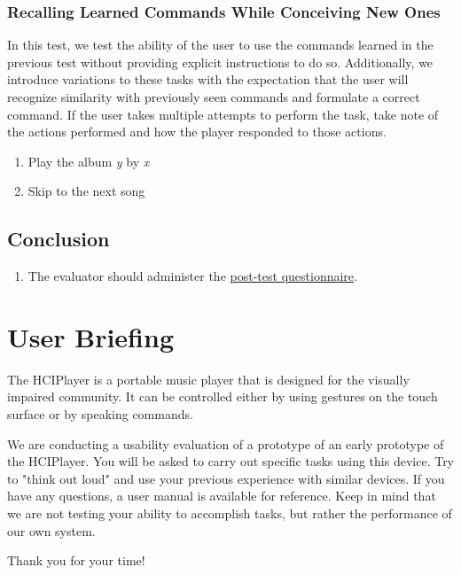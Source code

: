 \documentclass[12pt,letterpaper]{article}
\begin{document}
\subsubsection{Recalling Learned Commands While Conceiving New Ones}
In this test, we test the ability of the user to use the commands learned in the previous test without providing explicit instructions to do so. Additionally, we introduce variations to these tasks with the expectation that the user will recognize similarity with previously seen commands and formulate a correct command. If the user takes multiple attempts to perform the task, take note of the actions performed and how the player responded to those actions.
\begin{enumerate}
\item Play the album \textit{y} by \textit{x}
\item Skip to the next song
\end{enumerate}

\subsection{Conclusion}

\begin{enumerate}
\item The evaluator should administer the \href{http://fluidsurveys.com/s/hciplayer-posttest/}{post-test questionnaire}.
\end{enumerate}

\section{User Briefing}

The HCIPlayer is a portable music player that is designed for the visually impaired community. It can be controlled either by using gestures on the touch surface or by speaking commands.

We are conducting a usability evaluation of a prototype of an early prototype of the HCIPlayer. You will be asked to carry out specific tasks using this device. Try to "think out loud" and use your previous experience with similar devices. If you have any questions, a user manual is available for reference. Keep in mind that we are not testing your ability to accomplish tasks, but rather the performance of our own system.

Thank you for your time!
\end{document}
